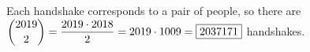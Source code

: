 Each handshake corresponds to a pair of people, so there are $\dbinom{2019}{2}=\dfrac{2019\cdot2018}{2}=2019\cdot1009=\boxed{2037171}$ handshakes.
